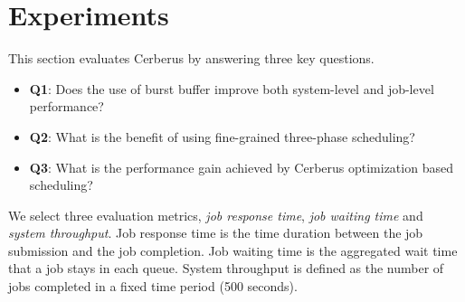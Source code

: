 \section{Experiments}
\label{Sec:Experiments}


This section evaluates Cerberus by answering three key questions.
\begin{itemize}
        \item \textbf{Q1}: Does the use of burst buffer 
        improve both system-level and job-level performance?
        \item \textbf{Q2}: What is the benefit of using 
        fine-grained three-phase scheduling?
        \item \textbf{Q3}: What is the performance gain achieved 
        by Cerberus optimization based scheduling?
\end{itemize}



We select three evaluation metrics, \textit{job response time}, \textit{job waiting time} and \textit{system throughput}.
Job response time is the time duration between the job submission and the job completion. 
Job waiting time is the aggregated wait time that a job stays in each queue.
System throughput is defined as the number of jobs completed in a fixed time period (500 seconds).

